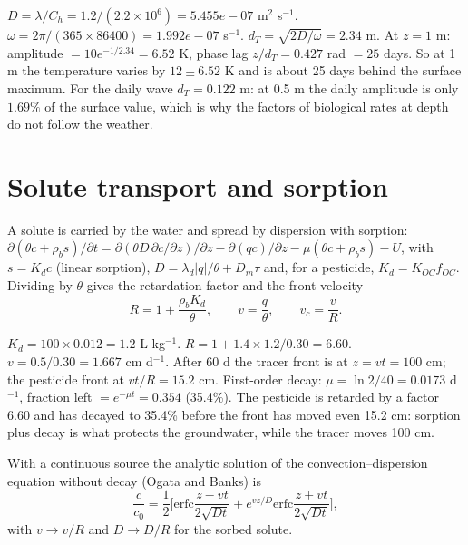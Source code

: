 \sol  $D=\lambda/C_h=1.2/(2.2\times10^6)=5.455e-07$ m$^2$ s$^{-1}$. $\omega=2\pi/(365\times86400)=1.992e-07$ s$^{-1}$. $d_T=\sqrt{2D/\omega}=2.34$ m. At $z=1$ m: amplitude $=10e^{-1/2.34}=6.52$ K, phase lag $z/d_T=0.427$ rad $=25$ days. So at 1 m the temperature varies by $12\pm6.52$ K and is about 25 days behind the surface maximum. For the daily wave $d_T=0.122$ m: at 0.5 m the daily amplitude is only $1.69\%$ of the surface value, which is why the factors of biological rates at depth do not follow the weather.


\section{Solute transport and sorption}
A solute is carried by the water and spread by dispersion with sorption: $\partial(\theta c+\rho_bs)/\partial t=\partial(\theta D\,\partial c/\partial z)/\partial z-\partial(qc)/\partial z-\mu(\theta c+\rho_bs)-U$, with $s=K_dc$ (linear sorption), $D=\lambda_d|q|/\theta+D_m\tau$ and, for a pesticide, $K_d=K_{OC}f_{OC}$. Dividing by $\theta$ gives the retardation factor and the front velocity
\begin{equation}\boxed{R=1+\frac{\rho_bK_d}{\theta},\qquad v=\frac q\theta,\qquad v_c=\frac vR.}\end{equation}

\sol  $K_d=100\times0.012=1.2$ L kg$^{-1}$. $R=1+1.4\times1.2/0.30=6.60$. $v=0.5/0.30=1.667$ cm d$^{-1}$. After 60 d the tracer front is at $z=vt=100$ cm; the pesticide front at $vt/R=15.2$ cm. First-order decay: $\mu=\ln2/40=0.0173$ d$^{-1}$, fraction left $=e^{-\mu t}=0.354$ (35.4\%). The pesticide is retarded by a factor 6.60 and has decayed to 35.4\% before the front has moved even 15.2 cm: sorption plus decay is what protects the groundwater, while the tracer moves 100 cm.


With a continuous source the analytic solution of the convection--dispersion equation without decay (Ogata and Banks) is
\begin{equation}\boxed{\frac{c}{c_0}=\frac12\Big[\mathrm{erfc}\frac{z-vt}{2\sqrt{Dt}}+e^{vz/D}\mathrm{erfc}\frac{z+vt}{2\sqrt{Dt}}\Big],}\end{equation}
with $v\to v/R$ and $D\to D/R$ for the sorbed solute.

